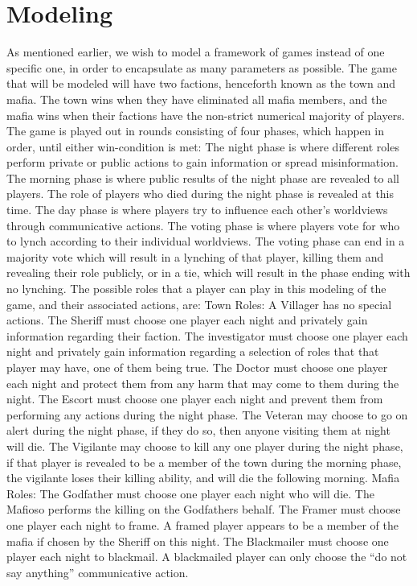 \section{Modeling}
As mentioned earlier, we wish to model a framework of games instead of one
specific one, in order to encapsulate as many parameters as possible. The game
that will be modeled will have two factions, henceforth known as the town and
mafia. The town wins when they have eliminated all mafia members, and the mafia
wins when their factions have the non-strict numerical majority of players. The
game is played out in rounds consisting of four phases, which happen in order,
until either win-condition is met: The night phase is where different roles
perform private or public actions to gain information or spread misinformation.
The morning phase is where public results of the night phase are revealed to
all players. The role of players who died during the night phase is revealed at
this time. The day phase is where players try to influence each other's
worldviews through communicative actions. The voting phase is where players
vote for who to lynch according to their individual worldviews. The voting
phase can end in a majority vote which will result in a lynching of that
player, killing them and revealing their role publicly, or in a tie, which will
result in the phase ending with no lynching. The possible roles that a player
can play in this modeling of the game, and their associated actions, are: Town
Roles: A Villager has no special actions. The Sheriff must choose one player
each night and privately gain information regarding their faction. The investigator must choose one
player each night and privately gain information regarding a selection of roles that that player
may have, one of them being true. The Doctor must choose one player each night
and protect them from any harm that may come to them during the night. The
Escort must choose one player each night and prevent them from performing any
actions during the night phase. The Veteran may choose to go on alert during
the night phase, if they do so, then anyone visiting them at night will die.
The Vigilante may choose to kill any one player during the night phase, if that
player is revealed to be a member of the town during the morning phase, the
vigilante loses their killing ability, and will die the following morning.
Mafia Roles: The Godfather must choose one player each night who will die. The
Mafioso performs the killing on the Godfathers behalf. The Framer must choose
one player each night to frame. A framed player appears to be a member of the
mafia if chosen by the Sheriff on this night. The Blackmailer must choose one
player each night to blackmail. A blackmailed player can only choose the “do
not say anything” communicative action.

